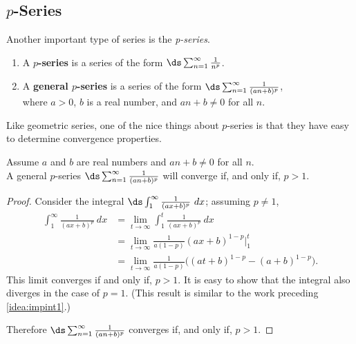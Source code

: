 \subsection{\texorpdfstring{$p$}{p}-Series}

Another important type of series is the \emph{p-series}.

{\begin{enumerate}
\item	A \textbf{$p$-series} is a series of the form
\qquad$\ds\sum_{n=1}^\infty \frac{1}{n^p}$.
\item	A \textbf{general $p$-series} is a series of the form 
\qquad$\ds\sum_{n=1}^\infty \frac{1}{(an+b)^p}$,\medskip\\
where $a>0$, $b$ is a real number, and $an+b\neq 0$ for all $n$.
\end{enumerate}}

Like geometric series, one of the nice things about $p$-series is that they have easy to determine convergence properties.

{Assume $a$ and $b$ are real numbers and  $an+b\neq 0$ for all $n$.\\
A general $p$-series $\ds\sum_{n=1}^\infty \frac{1}{(an+b)^p}$ will converge if, and only if, $p>1$.
}

\begin{proof}
Consider the integral $\ds\int_1^\infty \frac1{(ax+b)^p}\ dx$; assuming $p\neq 1$,
\begin{align*}
	\int_1^\infty \frac1{(ax+b)^p}\ dx
	&= \lim_{t\to\infty} \int_1^t \frac1{(ax+b)^p}\ dx \\
	&= \lim_{t\to\infty} \frac{1}{a(1-p)}(ax+b)^{1-p}\Big|_1^t\\
	&= \lim_{t\to\infty} \frac{1}{a(1-p)}\big((at+b)^{1-p}-(a+b)^{1-p}\big).
\end{align*}
This limit converges if and only if, $p>1$. It is easy to show that the integral also diverges in the case of $p=1$. (This result is similar to the work preceding \autoref{idea:impint1}.)

Therefore $\ds \sum_{n=1}^\infty \frac 1{(an+b)^p}$ converges if, and only if, $p>1$.
\end{proof}

